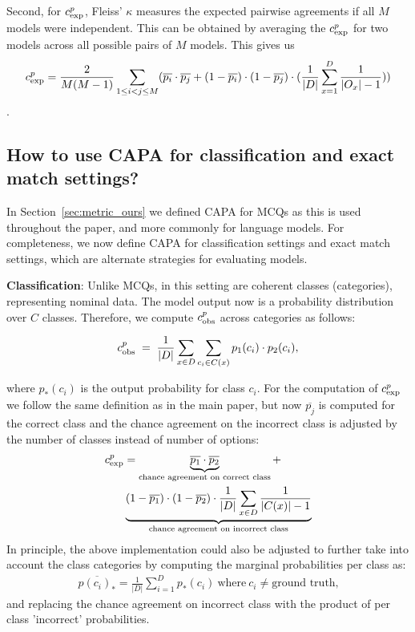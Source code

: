 Second, for $c_{\text{exp}}^{p}$, Fleiss' $\kappa$ measures the expected pairwise agreements if all $M$ models were independent. This can be obtained by averaging the $c_{\text{exp}}^{p}$ for two models across all possible pairs of $M$ models. This gives us $$c_{\text{exp}}^{p} = \frac{2}{M(M-1)}\sum_{1 \leq i < j \leq M} (\overline{p_i} \cdot \overline{p_j} + (1 - \overline{p_i}) \cdot (1 - \overline{p_j}) \cdot (\frac{1}{|D|} \sum_{x=1}^D \frac{1}{|O_x|-1}))$$.

\subsection{How to use CAPA for classification and exact match settings?}
\label{app:goelspi_classification}
In Section~\ref{sec:metric_ours} we defined CAPA for MCQs as this is used throughout the paper, and more commonly for language models. For completeness, we now define CAPA for classification settings and exact match settings, which are alternate strategies for evaluating models.

\textbf{Classification}: Unlike MCQs, in this setting are coherent classes (categories), representing nominal data. The model output now is a probability distribution over $C$ classes. Therefore, we compute $c_{\text{obs}}^{p}$ across categories as follows:

\begin{equation}
    c_{\text{obs}}^{p} \;=\; \frac{1}{|D|} \sum_{x \in D} \sum_{c_i \in C(x)} p_1(c_i) \cdot p_2(c_i),
\end{equation}

where $p_*(c_i)$ is the output probability for class $c_i$. 
For the computation of $c_{\text{exp}}^{p}$ we follow the same definition as in the main paper, but now $\overline{p_j}$ is computed for the correct class and the chance agreement on the incorrect class is adjusted by the number of classes instead of number of options:
\begin{align}
    c_{\text{exp}}^{p} &= \underbrace{\overline{p_1} \cdot \overline{p_2}}_{\text{chance agreement on correct class}} + \\ 
    &\underbrace{(1 - \overline{p_1}) \cdot (1 - \overline{p_2}) \cdot \frac{1}{|D|} \sum_{x \in D} \frac{1}{|C(x)|-1}}_{\text{chance agreement on incorrect class}}
\end{align}
In principle, the above implementation could also be adjusted to further take into account the class categories by computing the marginal probabilities per class as:
\begin{align}
    \overline{p(c_i)_*} = \frac{1}{|D|} \sum_{i=1}^{D}p_*(c_i) \: \text{where} \: c_i \neq \text{ground truth,}
\end{align}
and replacing the chance agreement on incorrect class with the product of per class 'incorrect' probabilities. 

